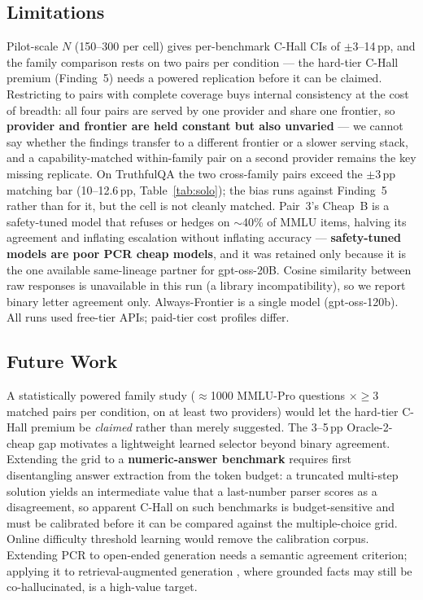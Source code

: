 \documentclass[conference]{IEEEtran}
\begin{document}
\subsection*{Limitations}
Pilot-scale $N$ (150--300 per cell) gives per-benchmark C-Hall CIs of
$\pm3$--14\,pp, and the family comparison rests on two pairs per condition --- the
hard-tier C-Hall premium (Finding~5) needs a powered replication before it can be
claimed. Restricting to pairs with complete coverage buys internal consistency at
the cost of breadth: all four pairs are served by one provider and share one
frontier, so \textbf{provider and frontier are held constant but also
unvaried} --- we cannot say whether the findings transfer to a different
frontier or a slower serving stack, and a capability-matched within-family pair
on a second provider remains the key missing replicate. On TruthfulQA the two
cross-family pairs exceed the $\pm3$\,pp matching bar (10--12.6\,pp,
Table~\ref{tab:solo}); the bias runs against Finding~5 rather than for it, but the
cell is not cleanly matched. Pair~3's Cheap~B is a safety-tuned model that refuses
or hedges on $\sim$40\% of MMLU items, halving its agreement and inflating
escalation without inflating accuracy --- \textbf{safety-tuned models are poor PCR
cheap models}, and it was retained only because it is the one available
same-lineage partner for gpt-oss-20B. Cosine similarity between raw responses is
unavailable in this run (a library incompatibility), so we report binary letter
agreement only. Always-Frontier is a single model (gpt-oss-120b). All runs used
free-tier APIs; paid-tier cost profiles differ.

\subsection*{Future Work}
\label{sec:futurework}
A statistically powered family study ($\approx$1000 MMLU-Pro questions
$\times\geq$3 matched pairs per condition, on at least two providers) would let
the hard-tier C-Hall premium be \textit{claimed} rather than merely suggested.
The 3--5\,pp Oracle-2-cheap gap motivates a lightweight learned selector beyond
binary agreement. Extending the grid to a \textbf{numeric-answer benchmark}
requires first disentangling answer extraction from the token budget: a truncated
multi-step solution yields an intermediate value that a last-number parser scores
as a disagreement, so apparent C-Hall on such benchmarks is budget-sensitive and
must be calibrated before it can be compared against the multiple-choice grid.
Online difficulty threshold learning \cite{schroeder2025vcache} would remove the
calibration corpus. Extending PCR to open-ended generation needs a semantic
agreement criterion; applying it to retrieval-augmented generation
\cite{lewis2020rag}, where grounded facts may still be co-hallucinated, is a
high-value target.
\end{document}
